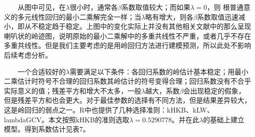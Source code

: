 \documentclass[
]{article}
\begin{document}
  从图中可见，在\(\lambda\)很小时，通常各\(\beta\)系数取值较大；而如果\(\lambda=0\)，则
根普通意义的多元线性回归的最小二乘解完全一样；当\(\lambda\)略有增大，则各\(\beta\)系数取值迅速减小，即从不稳定趋于稳定。上图中的变化实际上并没有其他相关文献中的那么呈现喇叭状的岭迹图，说明原始的最小二乘解中的多重共线性不严重，或者几乎不存在多重共线性。但是我们主要考虑的是用岭回归方法进行建模预测，所以此处不影响后续考虑分析。

  一个合适较好的\(\lambda\)需要满足以下条件：各回归系数的岭估计基本稳定；用最小二乘估计时符号不合理的回归系数其岭估计的符号变得合理；回归系数没有不合乎实际意义的值；残差平方和增大不太多，一般\(\lambda\)越大，系数\(\beta\)会出现稳定的假象，但是残差平方和也会更大。对于最佳参数的选择有不同方法，但是结果差异较大，这是岭回归的弱点之一。R中也提供了几种选择准则：kHKB、kLW、lambdaGCV。本文按照kHKB的准则选取\(\lambda=0.5290778\)。并在此\(\lambda\)的基础上建立模型。得到系数估计见表7。
\end{document}
